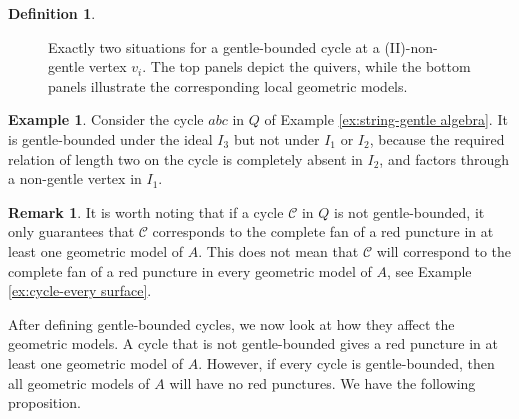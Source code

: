 \documentclass[11pt]{amsart}
\numberwithin{equation}{section}
\theoremstyle{definition}
\newtheorem{remark}[theorem]{Remark}
\newtheorem{example}[theorem]{Example}
\newtheorem{definition}[theorem]{Definition}
\newcommand{\rpoint}{\color{red}{\bullet}}
\begin{document}
\begin{definition}
\begin{figure}[htbp]

    \caption{Exactly two situations for a gentle-bounded cycle at a  (II)-non-gentle vertex $v_i$. The top panels depict the quivers, while the bottom panels illustrate the corresponding local geometric models.}
    \label{fig:gentle-bounded}
\end{figure}
\end{definition}

\begin{example}
    Consider the cycle $abc$ in $Q$ of Example \ref{ex:string-gentle algebra}. It is gentle-bounded under the ideal $I_3$ but not under $I_1$ or $I_2$, because the required relation of length two on the cycle is completely absent in $I_2$, and factors through a non-gentle vertex in $I_1$.
\end{example}
\begin{remark}
    It is worth noting that if a cycle $\mathcal{C}$ in $Q$ is not gentle-bounded, it only guarantees that $\mathcal{C}$ corresponds to the complete fan of a red puncture in at least one geometric model of $A$. This does not mean that $\mathcal{C}$ will correspond to the complete fan of a red puncture in every geometric model  of $A$, see Example \ref{ex:cycle-every surface}.
\end{remark}

After defining gentle-bounded cycles, we now look at how they affect the geometric models. A cycle that is not gentle-bounded gives a red puncture in at least one geometric model of $A$. However, if every cycle is gentle-bounded, then all geometric models of $A$ will have no red punctures. We have the following proposition.
\end{document}
